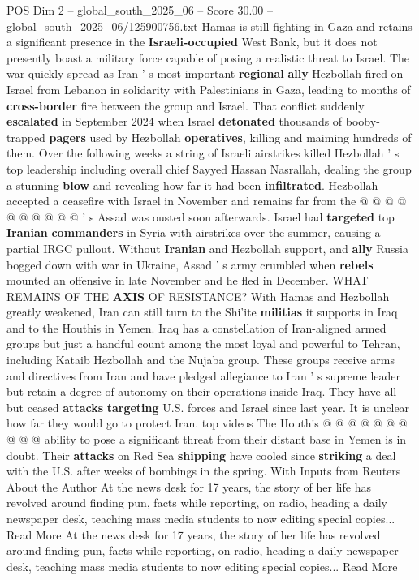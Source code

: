 \begin{textsample}{POS Dim 2 – global\_south\_2025\_06 – Score 30.00 – global\_south\_2025\_06/125900756.txt}
Hamas is still fighting in Gaza and retains a significant presence in the \textbf{Israeli-occupied} West Bank, but it does not presently boast a military force capable of posing a realistic threat to Israel.
The war quickly spread as Iran ' s most important \textbf{regional} \textbf{ally} Hezbollah fired on Israel from Lebanon in solidarity with Palestinians in Gaza, leading to months of \textbf{cross-border} fire between the group and Israel.
That conflict suddenly \textbf{escalated} in September 2024 when Israel \textbf{detonated} thousands of booby-trapped \textbf{pagers} used by Hezbollah \textbf{operatives}, killing and maiming hundreds of them.
Over the following weeks a string of Israeli airstrikes killed Hezbollah ' s top leadership including overall chief Sayyed Hassan Nasrallah, dealing the group a stunning \textbf{blow} and revealing how far it had been \textbf{infiltrated}.
Hezbollah accepted a ceasefire with Israel in November and remains far from the @ @ @ @ @ @ @ @ @ @ ' s Assad was ousted soon afterwards.
Israel had \textbf{targeted} top \textbf{Iranian} \textbf{commanders} in Syria with airstrikes over the summer, causing a partial IRGC pullout.
Without \textbf{Iranian} and Hezbollah support, and \textbf{ally} Russia bogged down with war in Ukraine, Assad ' s army crumbled when \textbf{rebels} mounted an offensive in late November and he fled in December.
WHAT REMAINS OF THE \textbf{AXIS} OF RESISTANCE?
With Hamas and Hezbollah greatly weakened, Iran can still turn to the Shi'ite \textbf{militias} it supports in Iraq and to the Houthis in Yemen.
Iraq has a constellation of Iran-aligned armed groups but just a handful count among the most loyal and powerful to Tehran, including Kataib Hezbollah and the Nujaba group.
These groups receive arms and directives from Iran and have pledged allegiance to Iran ' s supreme leader but retain a degree of autonomy on their operations inside Iraq.
They have all but ceased \textbf{attacks} \textbf{targeting} U.S. forces and Israel since last year.
It is unclear how far they would go to protect Iran. top videos The Houthis @ @ @ @ @ @ @ @ @ @ ability to pose a significant threat from their distant base in Yemen is in doubt.
Their \textbf{attacks} on Red Sea \textbf{shipping} have cooled since \textbf{striking} a deal with the U.S. after weeks of bombings in the spring.
With Inputs from Reuters About the Author At the news desk for 17 years, the story of her life has revolved around finding pun, facts while reporting, on radio, heading a daily newspaper desk, teaching mass media students to now editing special copies...
Read More At the news desk for 17 years, the story of her life has revolved around finding pun, facts while reporting, on radio, heading a daily newspaper desk, teaching mass media students to now editing special copies...
Read More

\end{textsample}
